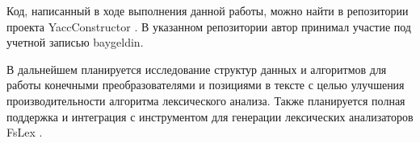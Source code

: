 \documentclass[14pt]{matmex-diploma}
\begin{document}
Код, написанный в ходе выполнения данной работы, можно найти в репозитории проекта YaccConstructor \cite{yacc_git}. В указанном репозитории автор принимал участие под учетной записью baygeldin.

В дальнейшем планируется исследование структур данных и алгоритмов для работы конечными преобразователями и позициями в тексте с целью улучшения производительности алгоритма лексического анализа. Также планируется полная поддержка и интеграция с инструментом для генерации лексических анализаторов FsLex \cite{fslex}.

\setmonofont[Mapping=tex-text]{CMU Typewriter Text}


\end{document}
